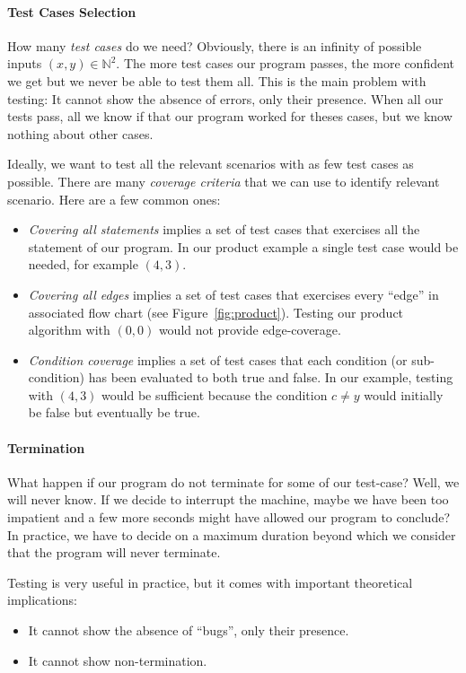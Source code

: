 \documentclass{aldast}
\begin{document}
\paragraph{Test Cases Selection}
How many \emph{test cases} do we need?  Obviously, there is an
infinity of possible inputs $(x,y) \in \mathbb{N}^2$. The more test
cases our program passes, the more confident we get but we never be
able to test them all. This is the main problem with testing: It
cannot show the absence of errors, only their presence. When all our
tests pass, all we know if that our program worked for theses cases,
but we know nothing about other cases.

Ideally, we want to test all the relevant scenarios with as few test
cases as possible. There are many \emph{coverage criteria} that we can
use to identify relevant scenario. Here are a few common ones:
\begin{itemize}
\item \emph{Covering all statements} implies a set of test cases that exercises
  all the statement of our program. In our product example a single
  test case would be needed, for example $(4, 3)$.
\item \emph{Covering all edges} implies a set of test cases that
  exercises every ``edge'' in associated flow chart (see
  Figure~\ref{fig:product}). Testing our product algorithm with
  $(0,0)$ would not provide edge-coverage.
\item \emph{Condition coverage} implies a set of test cases that each
  condition (or sub-condition) has been evaluated to both true and
  false. In our example, testing with $(4,3)$ would be sufficient
  because the condition $c \neq y$ would initially be false but
  eventually be true.
\end{itemize}

\paragraph{Termination} What happen if our program do not terminate
for some of our test-case? Well, we will never know. If we decide to
interrupt the machine, maybe we have been too impatient and a few more
seconds might have allowed our program to conclude? In practice, we
have to decide on a maximum duration beyond which we consider that the
program will never terminate.

\begin{takeaway}
  Testing is very useful in practice, but it comes with important
  theoretical implications:
  \begin{itemize}
  \item It cannot show the absence of ``bugs'', only their
    presence.
  \item It cannot show non-termination.
  \end{itemize}
\end{takeaway}
\end{document}
